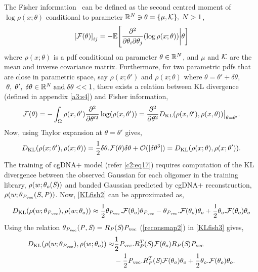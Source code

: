 The Fisher information~\cite{fisher} can be defined as the second centred moment of $\log{\rho(x;\theta)}$ conditional to parameter ${\mathbb R}^N \ni \theta = \{\mu,{\mathcal K}\}, \; N > 1$, 
\begin{equation}
\left[{\mathcal F}(\theta)\right]_{ij} = -\mathbb{E}\Bigg[\frac{\partial^2}{\partial\theta_i\partial\theta_j}(\log{\rho(x;\theta)})\bigg{|} \theta \bigg]
    \label{fishinfo2}
\end{equation}
where $\rho(x;\theta)$ is a pdf conditional on parameter $\theta \in {\mathbb R}^N$, and $\mu$ and ${\mathcal K}$ are the mean and inverse covariance matrix.   
Furthermore, for two parametric pdfs that are close in parametric space, say
$\rho(x;\theta') $ and $ \rho(x;\theta)$ where $\theta = \theta'+\delta\theta$,  $\;\theta,\; \theta', \; \delta\theta \in {\mathbb R}^N \; \text{and} \; \delta\theta <<1$, there exists a relation between KL divergence (defined in appendix \cref{a3:s4}) and Fisher information, 
\begin{equation}
{\mathcal F}(\theta) = -\int_{\Omega} \rho(x,\theta')\frac{\partial^2}{\partial\theta'^2}\log(\rho(x,\theta')) = \frac{\partial^2}{\partial\theta^2}D_{\text{KL}}(\rho(x,\theta'),\rho(x,\theta))\big|_{\theta=\theta'}.
\label{KLfish1}
\end{equation}
Now, using Taylor expansion at $\theta=\theta'$ gives, 
\begin{equation}
D_{\text{KL}}(\rho(x;\theta'), \rho(x;\theta)) = \frac{1}{2}\delta{\theta}.{\mathcal F}(\theta)\delta{\theta} + \mathcal{O}(|\delta{\theta}^3|) = D_{\text{KL}}(\rho(x;\theta),\rho(x;\theta')).
\label{KLfish2}
\end{equation}
The training of cgDNA$+$ model (refer \cref{c2:eq17}) requires computation of the KL divergence between the observed Gaussian for each oligomer in the training library, $\rho(w;\theta_{o}({\textit{S}}))$ and banded Gaussian predicted by cgDNA$+$ reconstruction, $\rho(w;\theta_{{\mathit{P}}_\text{vec}}(S,{\mathit{P}}))$. 
Now, \cref{KLfish2} can be approximated as, 
\begin{equation}
D_{\text{KL}}(\rho(w;\theta_{{\mathit{P}}_\text{vec}}), \rho(w;\theta_{o})) \approx \frac{1}{2}\theta_{{\mathit{P}}_\text{vec}}.{\mathcal F}(\theta_{o})\theta_{{\mathit{P}}_\text{vec}}- \theta_{{\mathit{P}}_\text{vec}}.{\mathcal F}(\theta_{o})\theta_{o} + \frac{1}{2}\theta_{o}.{\mathcal F}(\theta_{o})\theta_{o}
\label{KLfish3}
\end{equation}
Using the relation $\theta_{{\mathit{P}}_\text{vec}}({\mathit{P}},{\textit{S}}) = R_{{\mathit{P}}}({\textit{S}}){\mathit{P}}_\text{vec} $ (\cref{reconsmap2}) in \cref{KLfish3} gives, 
\begin{equation}
\begin{split}
D_{\text{KL}}(\rho(w;\theta_{{\mathit{P}}_\text{vec}}), \rho(w;\theta_{o})) \approx& \frac{1}{2}{\mathit{P}}_\text{vec}.R_{{\mathit{P}}}^{T}({\textit{S}}){\mathcal F}(\theta_{o})R_{{\mathit{P}}}({\textit{S}}){\mathit{P}}_\text{vec}\\ & -\frac{1}{2}{\mathit{P}}_\text{vec}.R_{{\mathit{P}}}^{T}({\textit{S}}){\mathcal F}(\theta_{o})\theta_{o} + \frac{1}{2}\theta_{o}.{\mathcal F}(\theta_{o})\theta_{o}.
\end{split}
\label{KLfish4}
\end{equation}
